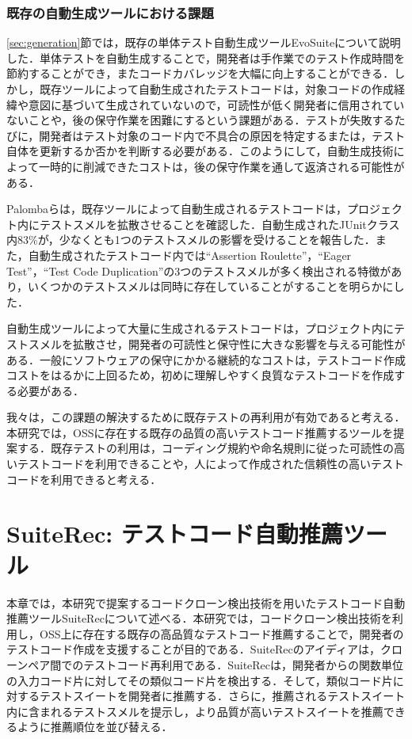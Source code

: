 \documentclass[12pt]{jarticle} %
\begin{document}
\subsubsection{既存の自動生成ツールにおける課題}

\ref{sec:generation}節では，既存の単体テスト自動生成ツール{\sf EvoSuite}について説明した．単体テストを自動生成することで，開発者は手作業でのテスト作成時間を節約することができ，またコードカバレッジを大幅に向上することができる．しかし，既存ツールによって自動生成されたテストコードは，対象コードの作成経緯や意図に基づいて生成されていないので，可読性が低く開発者に信用されていないことや，後の保守作業を困難にするという課題がある\cite{b14,b15,b13}．テストが失敗するたびに，開発者はテスト対象のコード内で不具合の原因を特定するまたは，テスト自体を更新するか否かを判断する必要がある．このようにして，自動生成技術によって一時的に削減できたコストは，後の保守作業を通して返済される可能性がある\cite{b1}．

Palombaら\cite{Fabio2016}は，既存ツールによって自動生成されるテストコードは，プロジェクト内にテストスメルを拡散させることを確認した．自動生成されたJUnitクラス内83\%が，少なくとも1つのテストスメルの影響を受けることを報告した．また，自動生成されたテストコード内では``Assertion Roulette''，``Eager Test''，``Test Code Duplication''の3つのテストスメルが多く検出される特徴があり，いくつかのテストスメルは同時に存在していることがすることを明らかにした．

自動生成ツールによって大量に生成されるテストコードは，プロジェクト内にテストスメルを拡散させ，開発者の可読性と保守性に大きな影響を与える可能性がある．一般にソフトウェアの保守にかかる継続的なコストは，テストコード作成コストをはるかに上回るため，初めに理解しやすく良質なテストコードを作成する必要がある．

我々は，この課題の解決するために既存テストの再利用が有効であると考える．本研究では，OSSに存在する既存の品質の高いテストコード推薦するツールを提案する．既存テストの利用は，コーディング規約や命名規則に従った可読性の高いテストコードを利用できることや，人によって作成された信頼性の高いテストコードを利用できると考える．


\newpage
\section{SuiteRec: テストコード自動推薦ツール}

本章では，本研究で提案するコードクローン検出技術を用いたテストコード自動推薦ツール{\sf SuiteRec}について述べる．本研究では，コードクローン検出技術を利用し，OSS上に存在する既存の高品質なテストコード推薦することで，開発者のテストコード作成を支援することが目的である．{\sf SuiteRec}のアイディアは，クローンペア間でのテストコード再利用である．{\sf SuiteRec}は，開発者からの関数単位の入力コード片に対してその類似コード片を検出する．そして，類似コード片に対するテストスイートを開発者に推薦する．さらに，推薦されるテストスイート内に含まれるテストスメルを提示し，より品質が高いテストスイートを推薦できるように推薦順位を並び替える．
\end{document}
